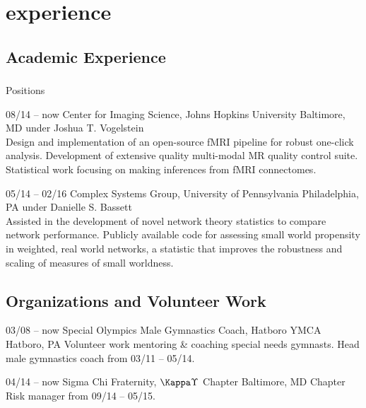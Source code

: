 \documentclass[]{friggeri-cv} %
\begin{document}

\section{experience}

\subsection{Academic Experience}

\subsubsection{}{Positions}

\begin{entrylist}
\entry
{08/14 -- now}
{Center for Imaging Science, Johns Hopkins University}
{Baltimore, MD}
{ under Joshua T. Vogelstein\\
Design and implementation of an open-source fMRI pipeline for robust one-click analysis. Development of extensive quality multi-modal MR quality control suite. Statistical work focusing on making inferences from fMRI connectomes.}

\entry
{05/14 -- 02/16}
{Complex Systems Group, University of Pennsylvania}
{Philadelphia, PA}
{ under Danielle S. Bassett\\
Assisted in the development of novel network theory statistics to compare network performance. Publicly available code for assessing small world propensity in weighted, real world networks, a statistic that improves the robustness and scaling of measures of small worldness.}

\end{entrylist}

\subsection{Organizations and Volunteer Work}

\begin{entrylist}
\entry
{03/08 -- now}
{Special Olympics Male Gymnastics Coach, Hatboro YMCA}
{Hatboro, PA}
{Volunteer work mentoring \& coaching special needs gymnasts. Head male gymnastics coach from 03/11 -- 05/14.}

\entry
{04/14 -- now}
{Sigma Chi Fraternity, $\Kappa\Upsilon$ Chapter}
{Baltimore, MD}
{Chapter Risk manager from 09/14 -- 05/15.}

\end{entrylist}
\end{document}
